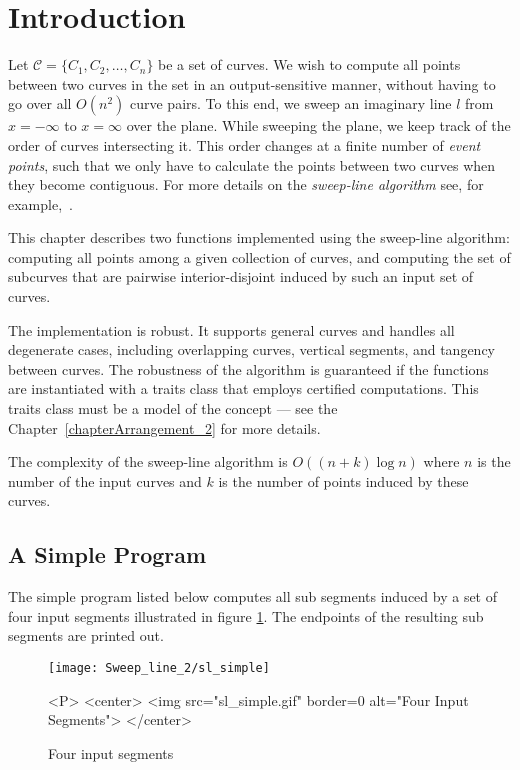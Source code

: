 \section{Introduction}

Let ${\mathcal C} = \{C_1, C_2, \ldots, C_n\}$ be a set of curves.
We wish to compute all  points between
two curves in the set in an output-sensitive manner, without having to
go over all $O(n^2)$ curve pairs. To this end, we sweep an imaginary line $l$
from $x = -\infty$ to $x = \infty$ over the plane. While sweeping
the plane, we keep track of the order of curves intersecting it.
This order changes at a finite number of \emph{event points}, such that
we only have to calculate the  points
between two curves when they become contiguous. For more details on the
\emph{sweep-line algorithm} see, for example,~\cite[Chapter~2]{bkos-cgaa-00}.

This chapter describes two functions implemented using the sweep-line
algorithm: computing all  points among a
given collection of curves, and computing the set of subcurves that are
pairwise interior-disjoint induced by such an input set of curves.

The implementation is robust. It supports general
curves and handles all degenerate cases, including overlapping curves,
vertical segments, and tangency between curves. The robustness of the
algorithm is guaranteed if the functions are instantiated with a traits
class that employs certified computations. This traits class must be a model
of the  concept --- see the
Chapter~\ref{chapterArrangement_2} for more details.

The complexity of the sweep-line algorithm is $O((n + k)\log{n})$ where $n$
is the  number of the input curves and $k$ is the number of
 points induced by these curves.

\subsection{A Simple Program}
The simple program listed below computes all sub segments induced by 
a set of four input segments illustrated in figure \ref{SL_sec:simple}.
The endpoints of the resulting sub segments are printed out.

\begin{figure}[hbp]
\begin{ccTexOnly}
\centerline{\texttt{[image: Sweep\_line\_2/sl\_simple]}}
\end{ccTexOnly}

\caption{Four input segments
\label{SL_sec:simple}}

\begin{ccHtmlOnly}
<P>
<center>
  <img src="sl_simple.gif" border=0 alt="Four Input Segments">
</center>
\end{ccHtmlOnly}
\end{figure}

